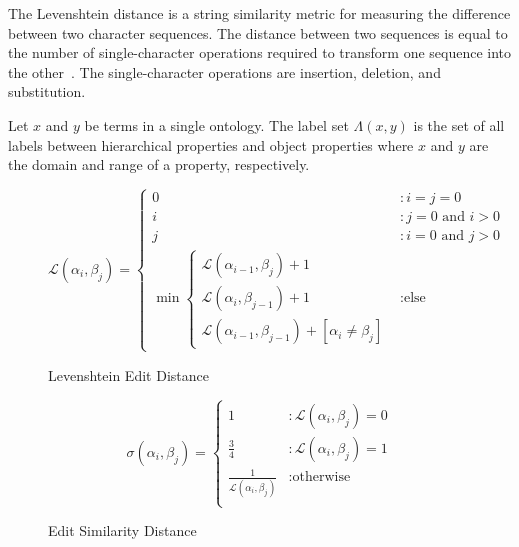 \documentclass[letterpaper,twocolumn,12pt]{article}
\begin{document}
The Levenshtein distance is a string similarity metric for measuring the difference between two character sequences. 
The distance between two sequences is equal to the number of single-character operations required to transform one sequence into the other~\cite{yujian:2007:levenshtein}. 
The single-character operations are insertion, deletion, and substitution.

\begin{defn}
Let $x$ and $y$ be terms in a single ontology. The label set $\Lambda \left( x, y \right)$ is the set of all labels between hierarchical properties and object properties where $x$ and $y$ are the domain and range of a property, respectively.
\end{defn}

\begin{figure*}
\centering
\begin{equation*}
\mathcal{L} 
\left( \alpha_i, \beta_j \right) = \left\{
	\begin{array}{ll}
   	 	0 &: i=j=0 \\
		i &: j = 0 \text{ and } i > 0 \\
		j &: i = 0 \text{ and } j > 0 \\
		\min 
			\left\{ 
			\begin{array}{l}
				\mathcal{L} \left( \alpha_{i-1}, \beta_j \right) + 1 \\
          		        \mathcal{L} \left( \alpha_i, \beta_{j-1} \right) + 1 \\
          		        \mathcal{L} \left( \alpha_{i-1}, \beta_{j-1} \right) + [\alpha_i \neq \beta_j]
			\end{array} \right. &: \text{else}
     \end{array}
\right.
\end{equation*}
\caption{Levenshtein Edit Distance}
\end{figure*}

\begin{figure*}
\centering
\begin{equation*}
\sigma
\left( \alpha_i, \beta_j \right) = \left\{
\begin{array}{ll}
  1           &: \mathcal{L} \left( \alpha_i, \beta_j \right) = 0 \\
  \frac{3}{4} &: \mathcal{L} \left( \alpha_i, \beta_j \right) = 1 \\
  \frac{1}{\mathcal{L} \left( \alpha_i, \beta_j \right)} &: \text{otherwise} \\
\end{array}
\right.
\end{equation*}
\caption{Edit Similarity Distance}
\end{figure*}
\end{document}
